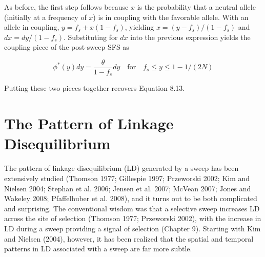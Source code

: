 \documentclass{article}
\begin{document}
As before, the first step follows because $x$ is the probability that a neutral allele (initially at a frequency of $x$) is in coupling with the favorable allele. With an allele in coupling, $y = f_s + x(1 - f_s)$, yielding $x = (y - f_s)/(1 - f_s)$ and $dx = dy/(1 - f_s)$. Substituting for $dx$ into the previous expression yields the coupling piece of the post-sweep SFS as

\begin{equation}
\phi^{*}(y)d y=\frac{\theta}{1-f_{s}}d y\quad\mathrm{f o r}\quad f_{s}\leq y\leq1-1/(2N)
\end{equation}

Putting these two pieces together recovers Equation 8.13.

\section{The Pattern of Linkage Disequilibrium}
The pattern of linkage disequilibrium (LD) generated by a sweep has been extensively studied (Thomson 1977; Gillespie 1997; Przeworski 2002; Kim and Nielsen 2004; Stephan et al. 2006; Jensen et al. 2007; McVean 2007; Jones and Wakeley 2008; Pfaffelhuber et al. 2008), and it turns out to be both complicated and surprising. The conventional wisdom was that a selective sweep increases LD across the site of selection (Thomson 1977; Przeworski 2002), with the increase in LD during a sweep providing a signal of selection (Chapter 9). Starting with Kim and Nielsen (2004), however, it has been realized that the spatial and temporal patterns in LD associated with a sweep are far more subtle.
\end{document}
